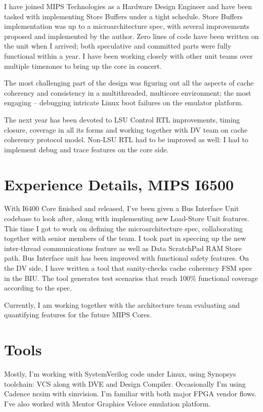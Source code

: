 \documentclass[a4paper]{scrartcl}
\begin{document}
I have joined MIPS Technologies as a Hardware Design Engineer and have been tasked with implementing Store Buffers under a tight schedule.
Store Buffers implementation was up to a microarchitecture spec, with several improvements proposed and implemented by the author.
Zero lines of code have been written on the unit when I arrived; both speculative and committed parts were fully functional within a year.
I have been working closely with other unit teams over multiple timezones to bring up the core in concert. 

The most challenging part of the design was figuring out all the aspects of cache coherency and consistency in a multithreaded, multicore environment; 
the most engaging -- debugging intricate Linux boot failures on the emulator platform. 

The next year has been devoted to LSU Control RTL improvements, timing closure, coverage in all its forms and working together with DV team on cache coherency protocol model.  
Non-LSU RTL had to be improved as well: I had to implement debug and trace features on the core side.

\section*{Experience Details, MIPS I6500}

With I6400 Core finished and released, I've been given a Bus Interface Unit codebase to look after, along with implementing new Load-Store Unit features.
This time I got to work on defining the microarchitecture spec, collaborating together with senior members of the team. 
I took part in speccing up the new inter-thread communications feature as well as Data ScratchPad RAM Store path.
Bus Interface unit has been improved with functional safety features. On the DV side, I have written a tool that sanity-checks cache coherency FSM spec in the BIU.
The tool generates test scenarios that reach 100\% functional coverage according to the spec.

Currently, I am working together with the architecture team evaluating and quantifying features for the future MIPS Cores.

\section*{Tools}

Mostly, I'm working with SystemVerilog code under Linux, using Synopsys toolchain: VCS along with DVE and Design Compiler. Occasionally I'm using Cadence ncsim with simvision.
I'm familiar with both major FPGA vendor flows. I've also worked with Mentor Graphics Veloce emulation platform.
\end{document}
